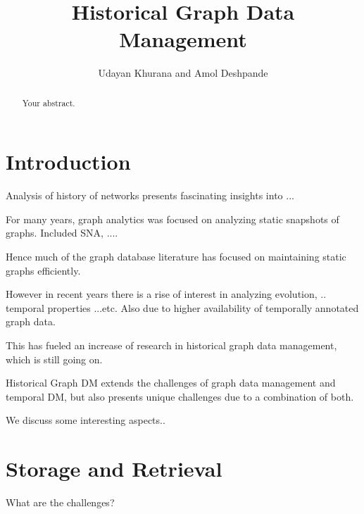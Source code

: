\documentclass{svjour3}
\begin{document}
\title{Historical Graph Data Management}
\author{Udayan Khurana and Amol Deshpande}
%
%
\maketitle

\begin{abstract}
Your abstract.
\end{abstract}

\section{Introduction}

Analysis of history of networks presents fascinating insights into ...

For many years, graph analytics was focused on analyzing static snapshots of graphs. Included SNA, ....

Hence much of the graph database literature has focused on maintaining static graphs efficiently. 

However in recent years there is a rise of interest in analyzing evolution, .. temporal properties ...etc. Also due to higher availability of temporally annotated graph data.

This has fueled an increase of research in historical graph data management, which is still going on. 

Historical Graph DM extends the challenges of graph data management and temporal DM, but also presents unique challenges due to a combination of both. 

We discuss some interesting aspects..



\section{Storage and Retrieval}
What are the challenges?
\end{document}
